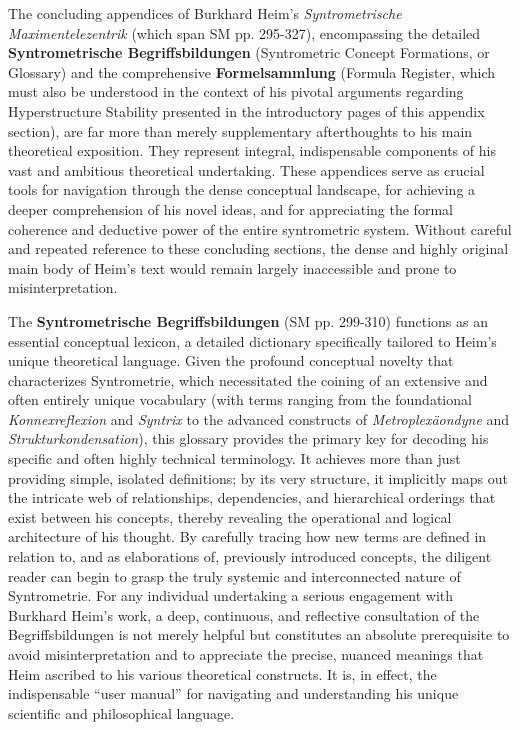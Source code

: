 \documentclass[12pt]{article}
\begin{document}
The concluding appendices of Burkhard Heim's \textit{Syntrometrische Maximentelezentrik} (which span SM pp. 295-327), encompassing the detailed \textbf{Syntrometrische Begriffsbildungen} (Syntrometric Concept Formations, or Glossary) and the comprehensive \textbf{Formelsammlung} (Formula Register, which must also be understood in the context of his pivotal arguments regarding Hyperstructure Stability presented in the introductory pages of this appendix section), are far more than merely supplementary afterthoughts to his main theoretical exposition. They represent integral, indispensable components of his vast and ambitious theoretical undertaking. These appendices serve as crucial tools for navigation through the dense conceptual landscape, for achieving a deeper comprehension of his novel ideas, and for appreciating the formal coherence and deductive power of the entire syntrometric system. Without careful and repeated reference to these concluding sections, the dense and highly original main body of Heim's text would remain largely inaccessible and prone to misinterpretation.

The \textbf{Syntrometrische Begriffsbildungen} (SM pp. 299-310) functions as an essential conceptual lexicon, a detailed dictionary specifically tailored to Heim's unique theoretical language. Given the profound conceptual novelty that characterizes Syntrometrie, which necessitated the coining of an extensive and often entirely unique vocabulary (with terms ranging from the foundational \textit{Konnexreflexion} and \textit{Syntrix} to the advanced constructs of \textit{Metroplexäondyne} and \textit{Strukturkondensation}), this glossary provides the primary key for decoding his specific and often highly technical terminology. It achieves more than just providing simple, isolated definitions; by its very structure, it implicitly maps out the intricate web of relationships, dependencies, and hierarchical orderings that exist between his concepts, thereby revealing the operational and logical architecture of his thought. By carefully tracing how new terms are defined in relation to, and as elaborations of, previously introduced concepts, the diligent reader can begin to grasp the truly systemic and interconnected nature of Syntrometrie. For any individual undertaking a serious engagement with Burkhard Heim's work, a deep, continuous, and reflective consultation of the Begriffsbildungen is not merely helpful but constitutes an absolute prerequisite to avoid misinterpretation and to appreciate the precise, nuanced meanings that Heim ascribed to his various theoretical constructs. It is, in effect, the indispensable \enquote{user manual} for navigating and understanding his unique scientific and philosophical language.
\end{document}
